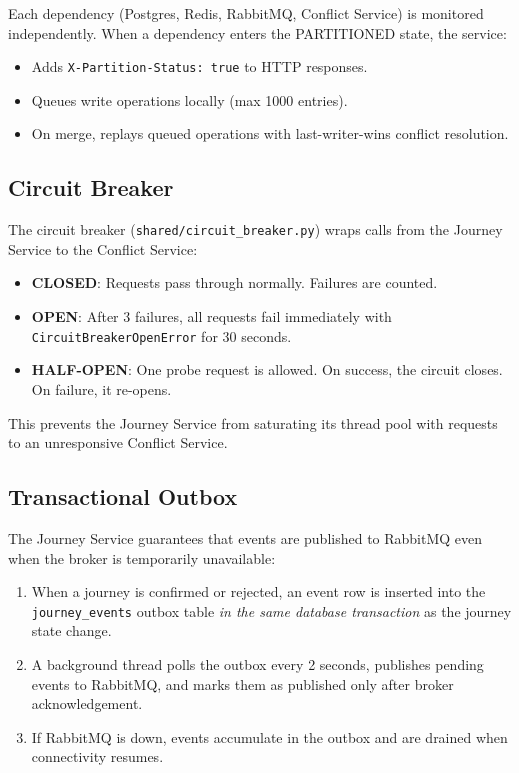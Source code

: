 \documentclass[12pt,a4paper]{article}
\begin{document}
Each dependency (Postgres, Redis, RabbitMQ, Conflict Service) is monitored independently. When a dependency enters the PARTITIONED state, the service:
\begin{itemize}[nosep]
  \item Adds \texttt{X-Partition-Status: true} to HTTP responses.
  \item Queues write operations locally (max 1000 entries).
  \item On merge, replays queued operations with last-writer-wins conflict resolution.
\end{itemize}

\subsection{Circuit Breaker}

The circuit breaker (\texttt{shared/circuit\_breaker.py}) wraps calls from the Journey Service to the Conflict Service:

\begin{itemize}[nosep]
  \item \textbf{CLOSED}: Requests pass through normally. Failures are counted.
  \item \textbf{OPEN}: After 3 failures, all requests fail immediately with \texttt{CircuitBreakerOpenError} for 30 seconds.
  \item \textbf{HALF-OPEN}: One probe request is allowed. On success, the circuit closes. On failure, it re-opens.
\end{itemize}

This prevents the Journey Service from saturating its thread pool with requests to an unresponsive Conflict Service.

\subsection{Transactional Outbox}

The Journey Service guarantees that events are published to RabbitMQ even when the broker is temporarily unavailable:

\begin{enumerate}[nosep]
  \item When a journey is confirmed or rejected, an event row is inserted into the \texttt{journey\_events} outbox table \emph{in the same database transaction} as the journey state change.
  \item A background thread polls the outbox every 2 seconds, publishes pending events to RabbitMQ, and marks them as published only after broker acknowledgement.
  \item If RabbitMQ is down, events accumulate in the outbox and are drained when connectivity resumes.
\end{enumerate}
\end{document}
